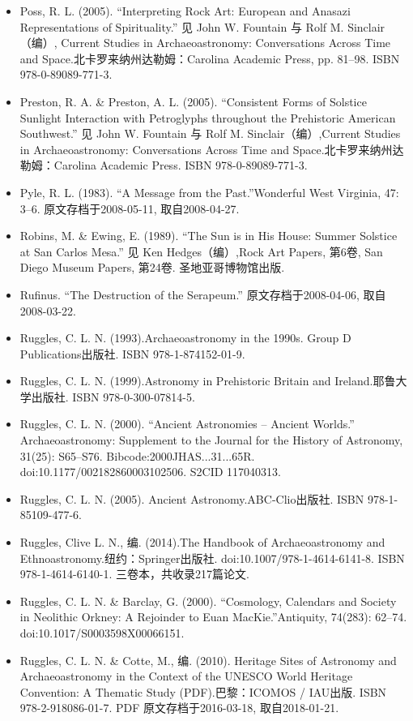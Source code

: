 \begin{itemize}
    \item Poss, R. L. (2005). “Interpreting Rock Art: European and Anasazi Representations of Spirituality.” 见 John W. Fountain 与 Rolf M. Sinclair（编）, Current Studies in Archaeoastronomy: Conversations Across Time and Space.北卡罗来纳州达勒姆：Carolina Academic Press, pp. 81–98. ISBN 978-0-89089-771-3.
    \item Preston, R. A. \& Preston, A. L. (2005). “Consistent Forms of Solstice Sunlight Interaction with Petroglyphs throughout the Prehistoric American Southwest.” 见 John W. Fountain 与 Rolf M. Sinclair（编）,Current Studies in Archaeoastronomy: Conversations Across Time and Space.北卡罗来纳州达勒姆：Carolina Academic Press. ISBN 978-0-89089-771-3.
    \item Pyle, R. L. (1983). “A Message from the Past.”Wonderful West Virginia, 47: 3–6. 原文存档于2008-05-11, 取自2008-04-27.
    \item Robins, M. \& Ewing, E. (1989). “The Sun is in His House: Summer Solstice at San Carlos Mesa.” 见 Ken Hedges（编）,Rock Art Papers, 第6卷, San Diego Museum Papers, 第24卷. 圣地亚哥博物馆出版.
    \item Rufinus. “The Destruction of the Serapeum.” 原文存档于2008-04-06, 取自2008-03-22.
    \item Ruggles, C. L. N. (1993).Archaeoastronomy in the 1990s. Group D Publications出版社. ISBN 978-1-874152-01-9.
    \item Ruggles, C. L. N. (1999).Astronomy in Prehistoric Britain and Ireland.耶鲁大学出版社. ISBN 978-0-300-07814-5.
    \item Ruggles, C. L. N. (2000). “Ancient Astronomies – Ancient Worlds.” Archaeoastronomy: Supplement to the Journal for the History of Astronomy, 31(25): S65–S76. Bibcode:2000JHAS...31...65R. doi:10.1177/002182860003102506. S2CID 117040313.
    \item Ruggles, C. L. N. (2005). Ancient Astronomy.ABC-Clio出版社. ISBN 978-1-85109-477-6.
    \item Ruggles, Clive L. N., 编. (2014).The Handbook of Archaeoastronomy and Ethnoastronomy.纽约：Springer出版社. doi:10.1007/978-1-4614-6141-8. ISBN 978-1-4614-6140-1. 三卷本，共收录217篇论文.
    \item Ruggles, C. L. N. \& Barclay, G. (2000). “Cosmology, Calendars and Society in Neolithic Orkney: A Rejoinder to Euan MacKie.”Antiquity, 74(283): 62–74. doi:10.1017/S0003598X00066151.
    \item Ruggles, C. L. N. \& Cotte, M., 编. (2010). Heritage Sites of Astronomy and Archaeoastronomy in the Context of the UNESCO World Heritage Convention: A Thematic Study (PDF).巴黎：ICOMOS / IAU出版. ISBN 978-2-918086-01-7. PDF 原文存档于2016-03-18, 取自2018-01-21.

\end{itemize}
